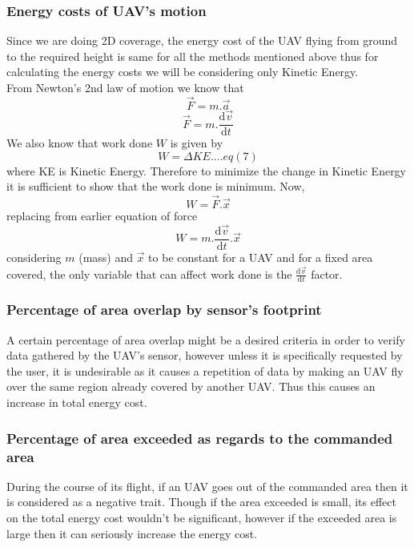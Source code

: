 \subsubsection{Energy costs of UAV's motion}
\label{subsubsec:ec2233}
Since we are doing 2D coverage, the energy cost of the UAV flying from ground to the required height is same for all the methods mentioned above thus for calculating the energy costs we will be considering only Kinetic Energy. \\
From Newton's 2nd law of motion we know that \\
\begin{equation}
\label{eq:en1}
\vec{F}=m.\vec{a}
\end{equation}
\begin{equation}
\label{eq:en2}
\vec{F}=m.\frac{\mathrm{d}\vec{v} }{\mathrm{d} t}
\end{equation}
We also know that work done $W$ is given by \\
\begin{equation}
\label{eq:en3}
W = \Delta KE....eq(7)
\end{equation}
where KE is Kinetic Energy. Therefore to minimize the change in Kinetic Energy it is sufficient to show that the work done is minimum. Now,\\
\begin{equation}
\label{en:eq4}
W = \vec{F}.\vec{x}
\end{equation}
replacing from earlier equation of force\\
\begin{equation}
\label{en:eq5}
W = m.\frac{\mathrm{d}\vec{v} }{\mathrm{d} t}.\vec{x}
\end{equation}
considering $m$ (mass) and $\vec{x}$ to be constant for a UAV and for a fixed area covered, the only variable that can affect work done is the $\frac{\mathrm{d}\vec{v} }{\mathrm{d} t}$ factor. 

\subsubsection{Percentage of area overlap by sensor's footprint}
A certain percentage of area overlap might be a desired criteria in order to verify data gathered by the UAV's sensor, however unless it is specifically requested by the user, it is undesirable as it causes a repetition of data by making an UAV fly over the same region already covered by another UAV. Thus this causes an increase in total energy cost.

\subsubsection{Percentage of area exceeded as regards to the commanded area}
During the course of its flight, if an UAV goes out of the commanded area then it is considered as a negative trait. Though if the area exceeded is small, its effect on the total energy cost wouldn't be significant, however if the exceeded area is large then it can seriously increase the energy cost.

